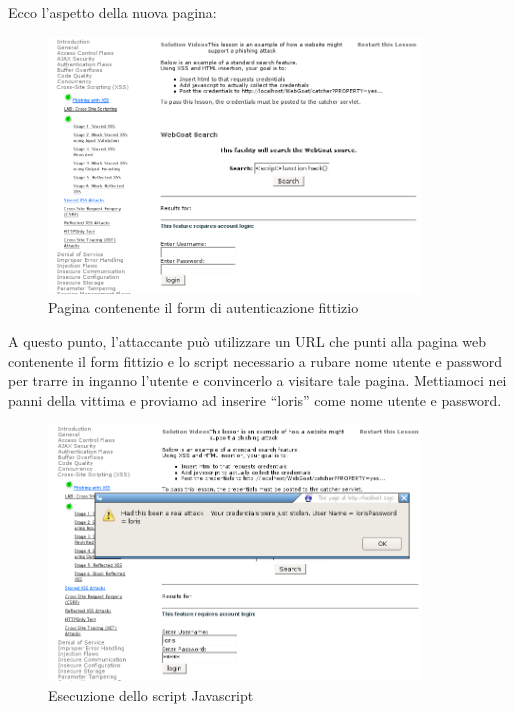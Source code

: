 \documentclass[a4paper,openright,italian]{article}
\begin{document}
Ecco l'aspetto della nuova pagina:
\begin{figure}[h]
\centering
\includegraphics[width=280pt]{images/xss_phishing_2.png}
\caption{Pagina contenente il form di autenticazione fittizio}
\end{figure}
\newline A questo punto, l'attaccante pu\`o utilizzare un URL che punti alla pagina web contenente il form fittizio e lo script necessario a rubare nome utente e password per trarre in inganno l'utente e convincerlo a visitare tale pagina. Mettiamoci nei panni della vittima e proviamo ad inserire ``loris'' come nome utente e password.
\clearpage
\begin{figure}[h]
\centering
\includegraphics[width=280pt]{images/xss_phishing_3.png}
\caption{Esecuzione dello script Javascript}
\end{figure}
\end{document}

